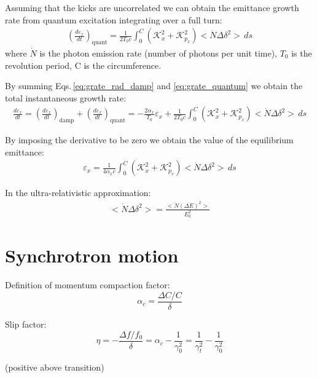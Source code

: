 Assuming that the kicks are uncorrelated we can obtain the emittance growth rate from quantum excitation integrating over a full turn:
\begin{align}
\left(\frac {d\varepsilon_x}{dt} \right)_\text{quant}= 
\frac{1}{2T_0c}\int_0^C\left(\mathcal{K}^2_x + \mathcal{K}^2_{p_x}\right)<\dot{N} \Delta \delta^2> \,ds
\label{eq:grate_quantum}
\end{align}
where $\dot{N}$ is the photon emission rate (number of photons per unit time), $T_0$ is the revolution period, C is the circumference.

By summing Eqs.\,\ref{eq:grate_rad_damp} and \ref{eq:grate_quantum} we obtain the total instantaneous growth rate:
\begin{align}
\frac {d\varepsilon_x}{dt} = 
\left(\frac {d\varepsilon_x}{dt}\right)_\text{damp}
+
\left(\frac {d\varepsilon_x}{dt}\right)_\text{quant}
=
- \frac{2\alpha_x}{T_0}  \varepsilon_x
+
\frac{1}{2T_0c}\int_0^C\left(\mathcal{K}^2_x + \mathcal{K}^2_{p_x}\right)<\dot{N} \Delta \delta^2> \,ds
\end{align}

By imposing the derivative to be zero we obtain the value of the equilibrium emittance:
\begin{align}
\varepsilon_x= 
\frac{1}{4\alpha_xc}\int_0^C\left(\mathcal{K}^2_x + \mathcal{K}^2_{p_x}\right)<\dot{N} \Delta \delta^2> \,ds
\label{eq:equilemi1}
\end{align}

In the ultra-relativistic approximation:
\begin{align}
<\dot{N} \Delta \delta^2> = 
\frac{<\dot{N} (\Delta E)^2>}{E_0^2}
\label{eq:equilemi2}
\end{align}

\section{Synchrotron motion}

Definition of momentum compaction factor:
\begin{equation}
\alpha_c = 
\frac{\Delta C/C}\delta
\end{equation}

Slip factor:
\begin{equation}
\eta = -\frac{\Delta f/f_0}{\delta} = \alpha_c - \frac{1}{\gamma_0^2}
= \frac{1}{\gamma_t^2}- \frac{1}{\gamma_0^2}
\end{equation}

(positive above transition)

